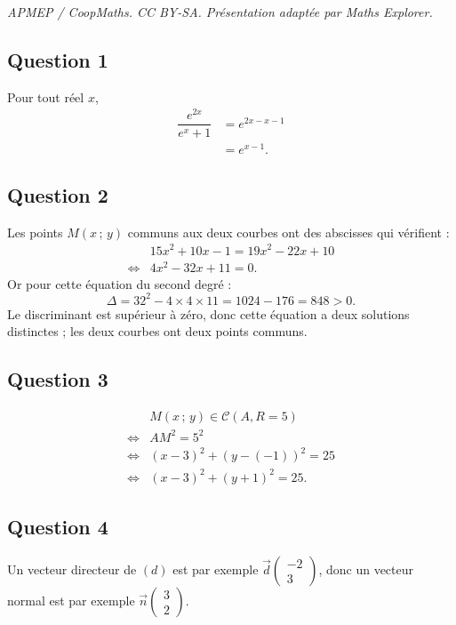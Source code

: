 \documentclass[10pt]{article}
\begin{document}
\noindent\textit{APMEP / CoopMaths. CC BY-SA. Présentation adaptée par Maths Explorer.}\par\medskip
\subsection*{Question 1}
	Pour tout réel \(x\),
	\begin{align*}
		\dfrac{e^{2x}}{e^x+1} &= e^{2x - x - 1} \\
		&= e^{x - 1}.
	\end{align*}
	
	\subsection*{Question 2}
	Les points \(M(x\,;\,y)\) communs aux deux courbes ont des abscisses qui vérifient :
	\begin{align*}
		&15x^2 + 10x - 1 = 19x^2 - 22x + 10 \\
		\iff & 4x^2 - 32x + 11=0.
	\end{align*}
	Or pour cette équation du second degré :
	\[
	\Delta = 32^2 - 4 \times 4 \times 11 = 1024 - 176 = 848 > 0.
	\]
	Le discriminant est supérieur à zéro, donc cette équation a deux solutions distinctes ; les deux courbes ont deux points communs.
	
	\subsection*{Question 3}
	\begin{align*}
		&M(x\,;\,y) \in \mathcal{C}(A, R = 5)\\
		\iff	&AM^2 = 5^2 \\
		\iff&   (x - 3)^2 + (y - (-1))^2 = 25 \\
		\iff&   (x - 3)^2 + (y + 1)^2 = 25.
	\end{align*}
	
	\subsection*{Question 4}
	Un vecteur directeur de \((d)\) est par exemple \(\vec{d}\begin{pmatrix}-2 \\ 3\end{pmatrix}\), donc un vecteur normal est par exemple \(\vec{n}\begin{pmatrix}3 \\ 2\end{pmatrix}.\)
	
\end{document}
